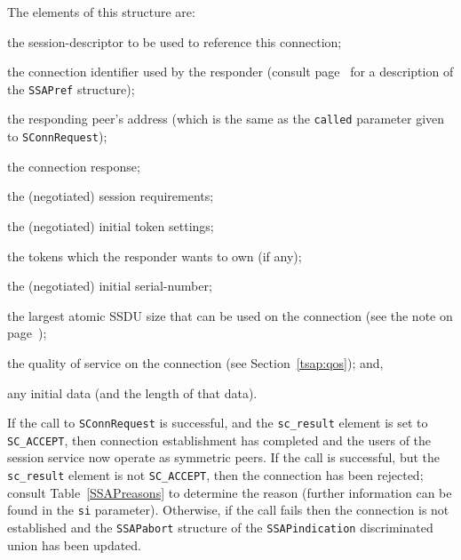 The elements of this structure are:
\begin{describe}
\item[\verb"sc\_sd":] the session-descriptor to be used to reference this
connection;

\item[\verb"sc\_connect":] the connection identifier used by the responder
(consult page~\pageref{SSAPref} for a description of the \verb"SSAPref"
structure);

\item[\verb"sc\_responding":] the responding peer's address
(which is the same as the \verb"called" parameter given to
\verb"SConnRequest");

\item[\verb"sc\_result":] the connection response;

\item[\verb"sc\_requirements":] the (negotiated) session requirements;

\item[\verb"sc\_settings":] the (negotiated) initial token settings;

\item[\verb"sc\_please":] the tokens which the responder wants to own
(if any);

\item[\verb"sc\_isn":] the (negotiated) initial serial-number;

\item[\verb"sc\_ssdusize":] the largest atomic SSDU size that can be used on
the connection (see the note on page~\pageref{SSDU:atomic});

\item[\verb"sc\_qos":] the quality of service on the connection
(see Section~\ref{tsap:qos});
and,

\item[\verb"sc\_data"/\verb"sc\_cc":] any initial data (and the length of
that data).
\end{describe}
If the call to \verb"SConnRequest" is successful,
and the \verb"sc_result" element is set to \verb"SC_ACCEPT",
then connection establishment has completed and the users of the session
service now operate as symmetric peers.
If the call is successful,
but the \verb"sc_result" element is not \verb"SC_ACCEPT",
then the connection has been rejected;
consult Table~\ref{SSAPreasons} to determine the reason
(further information can be found in the \verb"si" parameter).
Otherwise, if the call fails then the connection is not established and the
\verb"SSAPabort" structure of the \verb"SSAPindication" discriminated union
has been updated.


